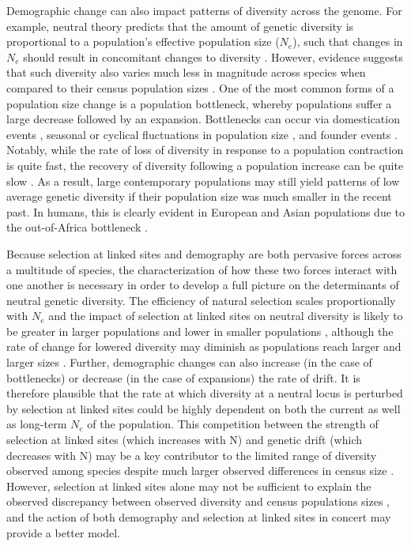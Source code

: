 \documentclass[9pt,twocolumn,twoside]{rilabRxiv}
\begin{document}
Demographic change can also impact patterns of diversity across the genome.
For example, neutral theory predicts that the amount of genetic diversity is proportional to a population’s effective population size (\textit{$N_e$}), such that changes in \textit{$N_e$} should result in concomitant changes to diversity \citep{kimura1983neutral}.
However, evidence suggests that such diversity also varies much less in magnitude across species when compared to their census population sizes \citep{lewontin1974genetic, leffler2012revisiting}.
One of the most common forms of a population size change is a population bottleneck, whereby populations suffer a large decrease followed by an expansion.
Bottlenecks can occur via domestication events \citep{doebley2006molecular, tang2010domestication, wiener2011deciphering, gaut2018demography}, seasonal or cyclical fluctuations in population size \citep{elton1924periodic, ives1970further, itoh2009seasonal, noren2014genetic}, and founder events \citep{david1988genetic, dlugosch2008founding, henn2012great}.
Notably, while the rate of loss of diversity in response to a population contraction is quite fast, the recovery of diversity following a population increase can be quite slow \citep{charlesworth2009effective}.
As a result, large contemporary populations may still yield patterns of low average genetic diversity if their population size was much smaller in the recent past.
In humans, this is clearly evident in European and Asian populations due to the out-of-Africa bottleneck \citep{10002015global}.

Because selection at linked sites and demography are both pervasive forces across a multitude of species, the characterization of how these two forces interact with one another is necessary in order to develop a full picture on the determinants of neutral genetic diversity.
The efficiency of natural selection scales proportionally with \textit{$N_e$} and the impact of selection at linked sites on neutral diversity is likely to be greater in larger populations and lower in smaller populations \citep{kaplan1989hitchhiking, cutter2013genomic, corbett2015natural}, although the rate of change for lowered diversity may diminish as populations reach larger and larger sizes \citep{gillespie2001population, santiago2016joint}.
Further, demographic changes can also increase (in the case of bottlenecks) or decrease (in the case of expansions) the rate of drift.
It is therefore plausible that the rate at which diversity at a neutral locus is perturbed by selection at linked sites could be highly dependent on both the current as well as long-term $N_e$ of the population.
This competition between the strength of selection at linked sites (which increases with N) and genetic drift (which decreases with N) may be a key contributor to the limited range of diversity observed among species  despite much larger observed differences in census size \citep{gillespie2001population, corbett2015natural, santiago2016joint}.
However, selection at linked sites alone may not be sufficient to explain the observed discrepancy between observed diversity and census populations sizes \citep{coop2016does}, and the action of both demography and selection at linked sites in concert may provide a better model.
\end{document}
